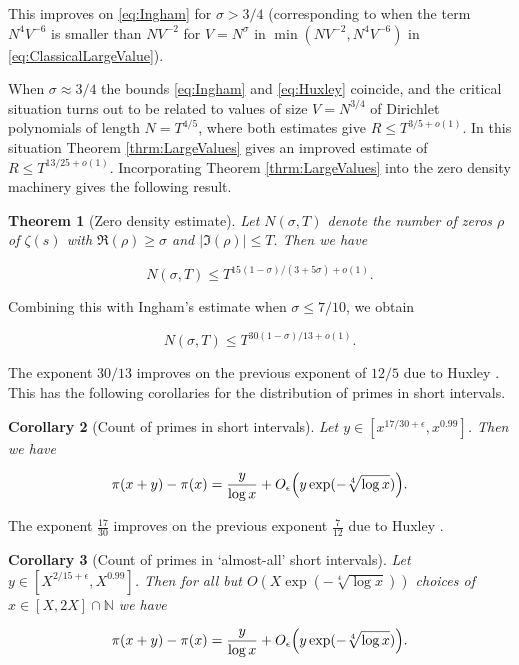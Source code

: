 \documentclass{amsart}
\theoremstyle{plain}
\newtheorem{thrm}{Theorem}[section]
\newtheorem{crllry}[thrm]{Corollary}
\numberwithin{equation}{section}
\begin{document}
This improves on \eqref{eq:Ingham} for $\sigma > 3/4$ (corresponding to when the term $N^4V^{-6}$ is smaller than $NV^{-2}$ for $V=N^\sigma$ in $\min(NV^{-2},N^4V^{-6})$ in \eqref{eq:ClassicalLargeValue}).

When $\sigma\approx 3/4$ the bounds \eqref{eq:Ingham} and \eqref{eq:Huxley} coincide, and the critical situation turns out to be related to values of size $V=N^{3/4}$ of Dirichlet polynomials of length $N=T^{4/5}$, where both estimates give $R\le T^{3/5+o(1)}$. In this situation Theorem \ref{thrm:LargeValues} gives an improved estimate of $R\le T^{13/25+o(1)}$. Incorporating Theorem \ref{thrm:LargeValues} into the zero density machinery gives the following result.

%
%

\begin{thrm}[Zero density estimate]\label{thrm:ZeroDensity}
Let $N(\sigma,T)$ denote the number of zeros $\rho$ of $\zeta(s)$ with $\Re(\rho)\ge \sigma$ and $|\Im(\rho)|\le T$. Then we have

\[
N(\sigma,T)\le T^{15(1-\sigma)/(3+5\sigma)+o(1)}.
\]

\end{thrm}

Combining this with Ingham's estimate when $\sigma\le 7/10$, we obtain 

\begin{equation}
N(\sigma,T)\le T^{30(1-\sigma)/13+o(1)}.
\label{eq:ZeroDensity}
\end{equation}

The exponent $30/13$ improves on the previous exponent of $12/5$ due to Huxley \cite{Hu}. This has the following corollaries for the distribution of primes in short intervals.

%
%

\begin{crllry}[Count of primes in short intervals]\label{crllry:All}
Let $y\in[x^{17/30+\epsilon},x^{0.99}]$. Then we have

\[
\pi(x+y)-\pi(x)=\frac{y}{\log{x}}+O_\epsilon\Bigl(y \exp(-\sqrt[4]{\log{x}})\Bigr).
\]

\end{crllry}

The exponent $\frac{17}{30}$ improves on the previous exponent $\frac{7}{12}$ due to Huxley \cite{Hu}.  

%
%

\begin{crllry}[Count of primes in `almost-all' short intervals]\label{crllry:AlmostAll}
Let $y\in [X^{2/15+\epsilon},X^{0.99}]$. Then for all but $O(X\exp(-\sqrt[4]{\log{x}}))$ choices of $x\in [X,2X]\cap\mathbb{N}$ we have

\[
\pi(x+y)-\pi(x)=\frac{y}{\log{x}}+O_\epsilon\Bigl(y \exp(-\sqrt[4]{\log{x}})\Bigr).
\]

\end{crllry}
\end{document}
